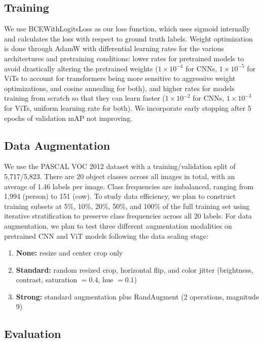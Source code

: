 \documentclass{article}
\begin{document}
\subsection{Training}

We use BCEWithLogitsLoss as our loss function, which uses sigmoid internally and calculates the loss with respect to ground truth labels. Weight optimization is done through AdamW with differential learning rates for the various architectures and pretraining conditions: lower rates for pretrained models to avoid drastically altering the pretrained weights ($1 \times 10^{-4}$ for CNNs, $1 \times 10^{-5}$ for ViTs to account for transformers being more sensitive to aggressive weight optimizations, and cosine annealing for both), and higher rates for models training from scratch so that they can learn faster ($1 \times 10^{-2}$ for CNNs, $1 \times 10^{-3}$ for ViTs, uniform learning rate for both). We incorporate early stopping after 5 epochs of validation mAP not improving.

\subsection{Data Augmentation}

We use the PASCAL VOC 2012 dataset with a training/validation split of 5,717/5,823. There are 20 object classes across all images in total, with an average of 1.46 labels per image. Class frequencies are imbalanced, ranging from 1,994 (person) to 151 (cow). To study data efficiency, we plan to construct training subsets at 5\%, 10\%, 20\%, 50\%, and 100\% of the full training set using iterative stratification to preserve class frequencies across all 20 labels. For data augmentation, we plan to test three different augmentation modalities on pretrained CNN and ViT models following the data scaling stage:

\begin{enumerate}
    \item \textbf{None:} resize and center crop only
    \item \textbf{Standard:} random resized crop, horizontal flip, and color jitter (brightness, contrast, saturation $= 0.4$, hue $= 0.1$)
    \item \textbf{Strong:} standard augmentation plus RandAugment (2 operations, magnitude 9)
\end{enumerate}

\subsection{Evaluation}
\end{document}

